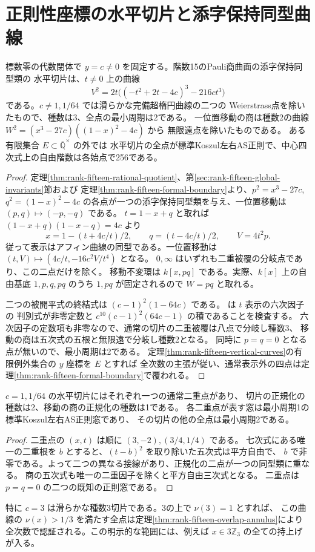 \section{正則性座標の水平切片と添字保持同型曲線}
\label{sec:rank-fifteen-horizontal-fibers}
\begin{theorem}\label{thm:rank-fifteen-horizontal-fibers}
標数零の代数閉体で $y=c\ne0$ を固定する。階数15のPauli商曲面の添字保持同型類の
水平切片は、$t\ne0$ 上の曲線
\[
       V^2=2t\bigl((-t^2+2t-4c)^3-216ct^3\bigr)
\]
である。$c\ne1,1/64$ では滑らかな完備超楕円曲線の二つの
Weierstrass点を除いたもので、種数は3、全点の最小周期は2である。
一位置移動の商は種数2の曲線 $W^2=(x^3-27c)((1-x)^2-4c)$ から
無限遠点を除いたものである。
ある有限集合 $E\subset\overline{\mathbb Q}^{\times}$ の外では
水平切片の全点が標準Koszul左右AS正則で、中心四次式上の自由階数は各始点で256である。
\end{theorem}
\begin{proof}
定理\ref{thm:rank-fifteen-rational-quotient}、第\ref{sec:rank-fifteen-global-invariants}節および
定理\ref{thm:rank-fifteen-formal-boundary}より、$p^2=x^3-27c$, $q^2=(1-x)^2-4c$
の各点が一つの添字保持同型類を与え、一位置移動は $(p,q)\mapsto(-p,-q)$ である。
$t=1-x+q$ と取れば $(1-x+q)(1-x-q)=4c$ より
\[
 x=1-(t+4c/t)/2,\qquad q=(t-4c/t)/2,\qquad V=4t^2p .
\]
従って表示はアフィン曲線の同型である。一位置移動は
$(t,V)\mapsto(4c/t,-16c^2V/t^4)$ となる。
$0,\infty$ はいずれも二重被覆の分岐点であり、この二点だけを除く。
移動不変環は $k[x,pq]$ である。実際、$k[x]$ 上の自由基底
$1,p,q,pq$ のうち $1,pq$ が固定されるので $W=pq$ と取れる。

二つの被開平式の終結式は $(c-1)^2(1-64c)$ である。
 は $t$ 表示の六次因子の
判別式が非零定数と $c^{10}(c-1)^2(64c-1)$ の積であることを検査する。
六次因子の定数項も非零なので、通常の切片の二重被覆は八点で分岐し種数3、
移動の商は五次式の五根と無限遠で分岐し種数2となる。
同時に $p=q=0$ となる点が無いので、最小周期は2である。
定理\ref{thm:rank-fifteen-vertical-curves}の有限例外集合の $y$ 座標を $E$ とすれば
全次数の主張が従い、通常表示外の四点は定理\ref{thm:rank-fifteen-formal-boundary}で覆われる。
\end{proof}
\begin{corollary}
$c=1,1/64$ の水平切片にはそれぞれ一つの通常二重点があり、
切片の正規化の種数は2、移動の商の正規化の種数は1である。
各二重点が表す窓は最小周期1の標準Koszul左右AS正則窓であり、
その切片の他の全点は最小周期2である。
\end{corollary}
\begin{proof}
二重点の $(x,t)$ は順に $(3,-2),(3/4,1/4)$ である。
七次式にある唯一の二重根を $b$ とすると、$(t-b)^2$ を取り除いた五次式は平方自由で、
$b$ で非零である。よって二つの異なる接線があり、正規化の二点が一つの同型類に重なる。
商の五次式も唯一の二重因子を除くと平方自由三次式となる。
二重点は $p=q=0$ の二つの既知の正則窓である。
\end{proof}
特に $c=3$ は滑らかな種数3切片である。3の上で $\nu(3)=1$ とすれば、
この曲線の $\nu(x)>1/3$ を満たす全点は定理\ref{thm:rank-fifteen-overlap-annulus}により
全次数で認証される。この明示的な範囲には、例えば $x\in3\mathbb Z_3$ の全ての持上げが入る。
